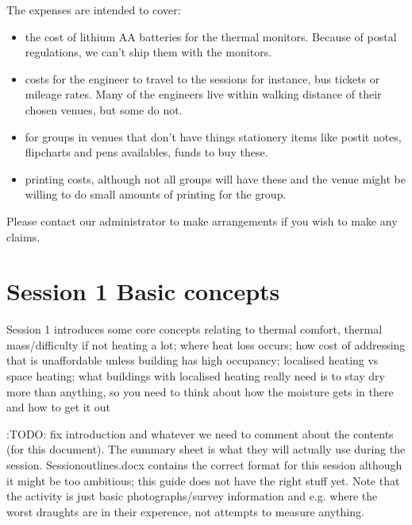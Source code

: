 \documentclass[letterpaper,10pt,english]{jupyterBook}
\begin{document}
\sphinxAtStartPar
The expenses are intended to cover:
\begin{itemize}
\item {} 
\sphinxAtStartPar
the cost of lithium AA batteries for the thermal monitors. Because of postal regulations, we can’t ship them with the monitors.

\item {} 
\sphinxAtStartPar
costs for the engineer to travel to the sessions \sphinxhyphen{} for instance, bus tickets or mileage rates.  Many of the engineers live within walking distance of their chosen venues, but some do not.

\item {} 
\sphinxAtStartPar
for groups in venues that don’t have things stationery items like post\sphinxhyphen{}it notes, flipcharts and pens availables, funds to buy these.

\item {} 
\sphinxAtStartPar
printing costs, although not all groups will have these and the venue might be willing to do small amounts of printing for the group.

\end{itemize}

\sphinxAtStartPar
Please contact our administrator to make arrangements if you wish to make any claims.

\sphinxstepscope


\chapter{Session 1 \sphinxhyphen{} Basic concepts}
\label{\detokenize{session1/session1:session-1-basic-concepts}}\label{\detokenize{session1/session1::doc}}
\sphinxAtStartPar
Session 1 introduces some core concepts relating to thermal comfort, thermal mass/difficulty if not heating a lot; where heat loss occurs; how cost of addressing that is unaffordable unless building has high occupancy; localised heating vs space heating; what buildings with localised heating really need is to stay dry more than anything, so you need to think about how the moisture gets in there and how to get it out

\sphinxAtStartPar
:TODO: fix introduction and whatever we need to comment about the contents (for this document).  The summary sheet is what they will actually use during the session.  Session\sphinxhyphen{}outlines.docx contains the correct format for this session although it might be too ambitious; this guide does not have the right stuff yet.  Note that the activity is just basic photographs/survey information and e.g. where the worst draughts are in their experence, not attempts to measure anything.
\end{document}
